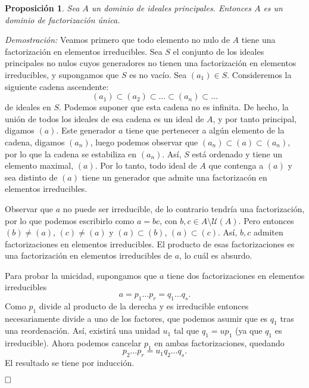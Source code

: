 \documentclass[12pt]{article}
\newtheorem{proposition}[theorem]{Proposición}
\begin{document}
\begin{proposition}Sea $A$ un dominio de ideales principales. Entonces $A$ es un dominio de factorización única.
\end{proposition}
\emph{Demostración: } Veamos primero que todo elemento no nulo de $A$ tiene una factorización en elementos irreducibles. Sea $S$ el conjunto de los ideales principales no nulos cuyos generadores no tienen una factorización en elementos irreducibles, y supongamos que $S$ es no vacío. Sea $(a_1) \in S$. Consideremos la siguiente cadena ascendente: 
$$(a_1) \subset (a_2) \subset \ldots \subset (a_n) \subset \ldots$$ de ideales en $S$. Podemos suponer que esta cadena no es infinita. De hecho, la unión de todos los ideales de esa cadena es un ideal de $A$, y por tanto principal, digamos $(a)$. Este generador $a$ tiene que pertenecer a algún elemento de la cadena, digamos $(a_n)$, luego podemos observar que $(a_n) \subset (a) \subset (a_n)$, por lo que la cadena se estabiliza en $(a_n)$. Así, $S$ está ordenado y tiene un elemento maximal, $(a)$. Por lo tanto, todo ideal de $A$ que contenga a $(a)$ y sea distinto de $(a)$ tiene un generador que admite una factorizacón en elementos irreducibles. 

Observar que $a$ no puede ser irreducible, de lo contrario tendría una factorización, por lo que podemos escribirlo como $a=bc$, con $b,c \in A \setminus \mathcal{U}(A)$. Pero entonces $(b) \neq (a)$, $(c) \neq (a)$ y $(a) \subset (b)$, $(a) \subset (c)$. Así, $b,c$ admiten factorizaciones en elementos irreducibles. El producto de esas factorizaciones es una factorización en elementos irreducibles de $a$, lo cuál es absurdo.

Para probar la unicidad, supongamos que $a$ tiene dos factorizaciones en elementos irreducibles $$a = p_1\ldots p_r = q_1 \ldots q_s.$$ Como $p_1$ divide al producto de la derecha y es irreducible entonces necesariamente divide a uno de los factores, que podemos asumir que es $q_1$ tras una reordenación. Así, existirá una unidad $u_1$ tal que $q_1 = up_1$ (ya que $q_1$ es irreducible). Ahora podemos cancelar $p_1$ en ambas factorizaciones, quedando $$p_2 \ldots p_r = u_1q_2 \ldots q_s.$$ El resultado se tiene por inducción.

$\hfill \square$
\end{document}
